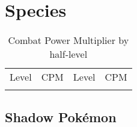 \chapter{Species}

\begin{table}
\begin{tabular}{l l l l }
Level & CPM & Level & CPM \\
\Midrule

\end{tabular}
\caption{Combat Power Multiplier by half-level}
\label{table:cpm}
\end{table}

\section{Shadow Pokémon}
